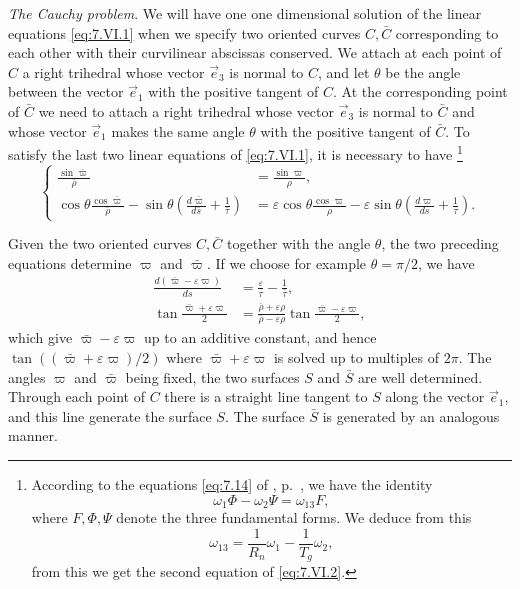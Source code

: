 \documentclass[leqno,11pt]{book}
\numberwithin{equation}{chapter}
\theoremstyle{shape1}
\theoremstyle{shape0}
\theoremstyle{shape2}
\theoremstyle{definition}
\begin{document}
\vspace{12pt}\fsec\emph{The Cauchy problem}. We will have one one dimensional solution of the linear equations \eqref{eq:7.VI.1} when we specify two oriented curves $C, \bar C$ corresponding to each other with their curvilinear abscissas conserved. We attach at each point of $C$ a right trihedral whose vector $\vec e_{3}$ is normal to $C$, and let $\theta$ be the angle between the vector $\vec e_{1}$ with the positive tangent of $C$. At the corresponding point of $\bar C$ we need to attach a right trihedral whose vector $\vec e_{3}$ is normal to $\bar C$ and whose vector $\vec e_{1}$ makes the same angle $\theta$ with the positive tangent of $\bar C$. To satisfy the last two linear equations of \eqref{eq:7.VI.1}, it is necessary to have \footnote{According to the equations \eqref{eq:7.14} of , p.~\pageref{pageref1}, we have the identity
\[
\omega_{1}\Phi-\omega_{2}\Psi=\omega_{13}F,
\]
where $F,\Phi,\Psi$ denote the three fundamental forms. We deduce from this
\[
\omega_{13}=\frac{1}{R_{n}}\omega_{1}-\frac{1}{T_{g}}\omega_{2},
\]
from this we get the second equation of \eqref{eq:7.VI.2}.
}
\begin{equation}
  \label{eq:7.VI.2}\tag{VI, 2}
  \left\{
    \begin{aligned}
      \frac{\sin\bar\varpi}{\bar\rho}&=\frac{\sin\varpi}{\rho},\\
      \cos\theta\frac{\cos\bar\varpi}{\bar\rho}-\sin\theta\left(\frac{d\bar\varpi}{d\bar s}+\frac{1}{\bar\tau}\right)&=\varepsilon\cos\theta\frac{\cos\varpi}{\rho}-\varepsilon\sin\theta\left(\frac{d\varpi}{ds}+\frac{1}{\tau}\right).
    \end{aligned}
  \right.
\end{equation}

Given the two oriented curves $C, \bar C$ together with the angle $\theta$, the two preceding equations determine $\varpi$ and $\bar \varpi$. If we choose for example $\theta=\pi / 2$, we have
\begin{align*}
  \frac{d(\bar \varpi-\varepsilon\varpi)}{ds}&=\frac{\varepsilon}{\tau}-\frac{1}{\bar\tau},\\
  \tan\frac{\bar\varpi+\varepsilon\varpi}{2}&=\frac{\bar\rho+\varepsilon\rho}{\bar\rho-\varepsilon\rho}\tan\frac{\bar\varpi-\varepsilon\varpi}{2},
\end{align*}
which give $\bar\varpi-\varepsilon\varpi$ up to an additive constant, and hence $\tan((\bar\varpi+\varepsilon\varpi)/2)$ where $\bar\varpi+\varepsilon\varpi$ is solved up to multiples of $2\pi$. The angles $\varpi$ and $\bar\varpi$ being fixed, the two surfaces $S$ and $\bar S$ are well determined. Through each point of $C$ there is a straight line tangent to $S$ along the vector $\vec e_{1}$, and this line generate the surface $S$. The surface $\bar S$ is generated by an analogous manner.
\end{document}
